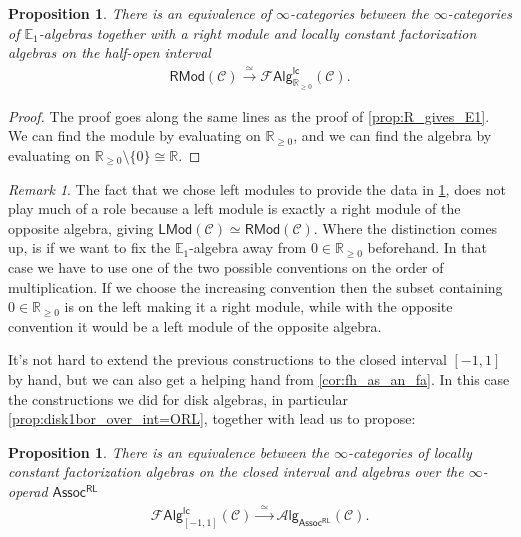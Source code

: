 \documentclass[12pt,a4paper]{article}
\newcounter{counter} \numberwithin{counter}{section}
\theoremstyle{definition}
\theoremstyle{plain}
\newtheorem{proposition}[counter]{Proposition}
\theoremstyle{remark}
\newtheorem{remark}[counter]{Remark}
\newcommand{\catC}{\mathscr{C}}
\newcommand{\lcfa}{\mathscr{F} \mathsf{Alg}^{\mathsf{lc}}}
\newcommand{\alg}[1]{\mathscr{A} \mathsf{lg}_{#1}}
\newcommand{\hoint}{\mathbb{R}_{\geq 0}}
\begin{document}
\begin{proposition}\label{prop:hoint_gives_modules}
    There is an equivalence of $\infty$-categories between the $\infty$-categories of $\mathbb{E}_1$-algebras together with a right module and locally constant factorization algebras on the half-open interval
    \begin{align}
        \mathsf{RMod}(\catC) \xrightarrow{\simeq} \lcfa_{\hoint} (\catC).
    \end{align}
\end{proposition}

\begin{proof}
    The proof goes along the same lines as the proof of \cref{prop:R_gives_E1}. We can find the module by evaluating on $\hoint$, and we can find the algebra by evaluating on $\hoint \setminus \{ 0 \} \cong \mathbb{R}$.
\end{proof}

\begin{remark}\label{rem:left_or_right_module}
    The fact that we chose left modules to provide the data in \cref{prop:hoint_gives_modules}, does not play much of a role because a left module is exactly a right module of the opposite algebra, giving $\mathsf{LMod}(\catC) \simeq \mathsf{RMod}(\catC)$. Where the distinction comes up, is if we want to fix the $\mathbb{E}_1$-algebra away from $0 \in \hoint$ beforehand. In that case we have to use one of the two possible conventions on the order of multiplication. If we choose the increasing convention then the subset containing $0 \in \hoint$ is on the left making it a right module, while with the opposite convention it would be a left module of the opposite algebra.
\end{remark}

It's not hard to extend the previous constructions to the closed interval $[-1,1]$ by hand, but we can also get a helping hand from \cref{cor:fh_as_an_fa}. In this case the constructions we did for disk algebras, in particular \cref{prop:disk1bor_over_int=ORL}, together with \cite[cor.2.33]{aft_fhstrat} lead us to propose:

\begin{proposition}
    There is an equivalence between the $\infty$-categories of locally constant factorization algebras on the closed interval and algebras over the $\infty$-operad $\mathsf{Assoc^{RL}}$
    \begin{align}
        \lcfa_{[-1,1]} (\catC) \xrightarrow{\ \ \simeq \ \ } \alg{\mathsf{Assoc^{RL}}} (\catC).
    \end{align} 
\end{proposition}
\end{document}
